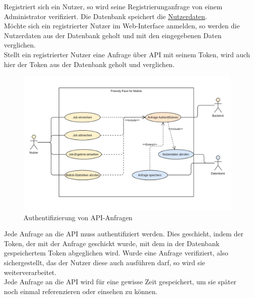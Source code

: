 Registriert sich ein Nutzer, so wird seine Registrierunganfrage von einem Administrator verifiziert. Die Datenbank speichert die \hyperref[PD:Nutzerdaten]{Nutzerdaten}.\\
Möchte sich ein registrierter Nutzer im Web-Interface anmelden, so werden die Nutzerdaten aus der Datenbank geholt und mit den eingegebenen Daten verglichen. \\
Stellt ein registrierter Nutzer eine Anfrage über API mit seinem Token, wird auch hier der Token aus der Datenbank geholt und verglichen.
\begin{figure}[H]
    \centering
    \includegraphics[width=\textwidth]{images-interface/Diagramme/Request_authntification_screenshot.jpg}
    \caption{Authentifizierung von API-Anfragen}
\end{figure}
Jede Anfrage an die API muss authentifiziert werden. Dies geschieht, indem der Token, der mit der Anfrage geschickt wurde, mit dem in der Datenbank gespeichertem Token abgeglichen wird. Wurde eine Anfrage verifiziert, also sichergestellt, das der Nutzer diese auch ausführen darf, so wird sie weiterverarbeitet.\\
Jede Anfrage an die API wird für eine gewisse Zeit gespeichert, um sie später noch einmal referenzieren oder einsehen zu können.

\pagebreak

